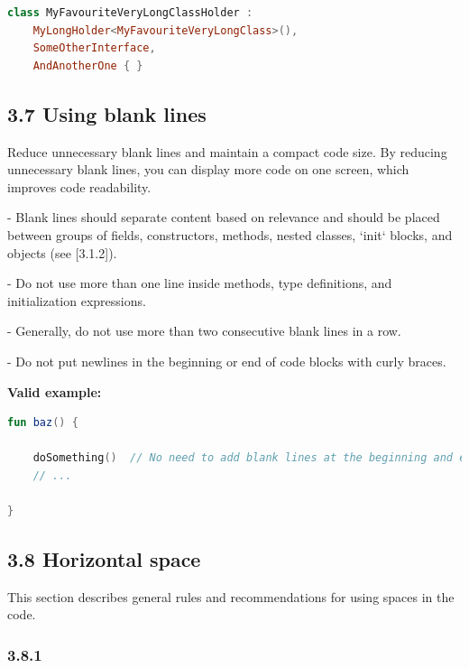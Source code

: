 {{\begin{lstlisting}[language=Kotlin]
class MyFavouriteVeryLongClassHolder :
    MyLongHolder<MyFavouriteVeryLongClass>(),
    SomeOtherInterface,
    AndAnotherOne { }
\end{lstlisting}


\subsection*{\textbf{3.7 Using blank lines}}

\label{sec:3.7}



Reduce unnecessary blank lines and maintain a compact code size. By reducing unnecessary blank lines, you can display more code on one screen, which improves code readability.

- Blank lines should separate content based on relevance and should be placed between groups of fields, constructors, methods, nested classes, `init` blocks, and objects (see [3.1.2]).

- Do not use more than one line inside methods, type definitions, and initialization expressions.

- Generally, do not use more than two consecutive blank lines in a row.

- Do not put newlines in the beginning or end of code blocks with curly braces.



\textbf{Valid example:}

\begin{lstlisting}[language=Kotlin]
fun baz() {
        
    doSomething()  // No need to add blank lines at the beginning and end of the code block
    // ...

}
\end{lstlisting}


\subsection*{\textbf{3.8 Horizontal space}}

\label{sec:3.8}

This section describes general rules and recommendations for using spaces in the code.

\subsubsection*{\textbf{3.8.1}}
\leavevmode\newline

}}

